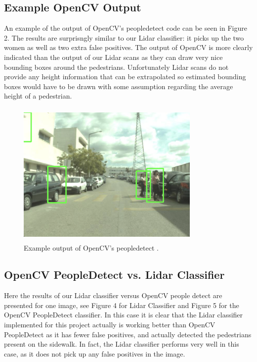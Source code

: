 \documentclass[10pt,twocolumn,letterpaper]{article}
\begin{document}
  \subsection{Example OpenCV Output}
  An example of the output of OpenCV's peopledetect \cite{opencv} code can be seen in Figure 2.
  The results are surprisngly similar to our Lidar classifier: it picks up the two
  women as well as two extra false positives. The output of OpenCV is more clearly
  indicated than the output of our Lidar scans as they can draw very nice bounding
  boxes around the pedestrians. Unfortunately Lidar scans do not provide any height
  information that can be extrapolated so estimated bounding boxes would have to be
  drawn with some assumption regarding the average height of a pedestrian.

  \begin{figure}
    \includegraphics[height=2.8in, width=3.5in]{images/peopledetect.png}
    \caption{ Example output of OpenCV's peopledetect \cite{opencv}. }
  \end{figure}


  \subsection{OpenCV PeopleDetect vs. Lidar Classifier}
  Here the results of our Lidar classifier versus OpenCV people detect are 
  presented for one image, see Figure 4 for Lidar Classifier and Figure 5
  for the OpenCV PeopleDetect \cite{opencv} classifier. In this case it is clear 
  that the Lidar classifier implemented for this project actually is working 
  better than OpenCV PeopleDetect \cite{opencv} as it has fewer false positives, 
  and actually detected the pedestrians present on the sidewalk. In fact, the 
  Lidar classifier performs very well in this case, as it does not pick up
  any false positives in the image.
\end{document}
